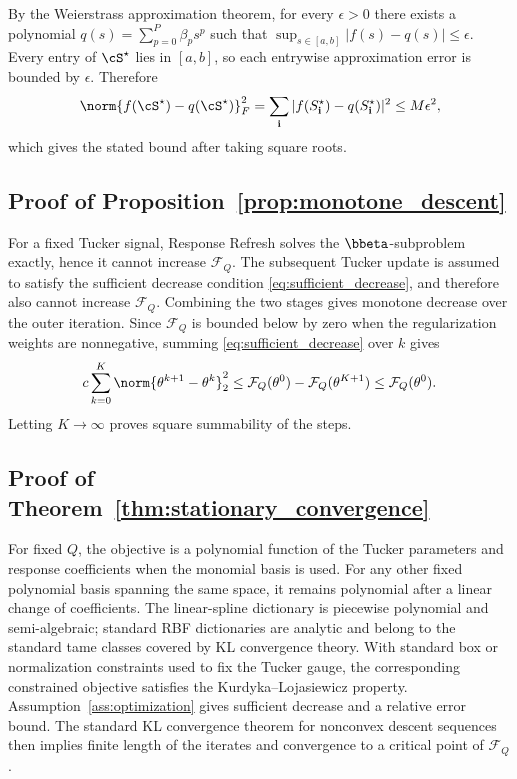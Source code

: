 By the Weierstrass approximation theorem, for every $\epsilon>0$ there exists
a polynomial $q(s)=\sum_{p=0}^{P}\beta_ps^p$ such that
$\sup_{s\in[a,b]}|f(s)-q(s)|\le\epsilon$. Every entry of $\cS^\star$ lies in
$[a,b]$, so each entrywise approximation error is bounded by $\epsilon$.
Therefore
\[
  \norm{f(\cS^\star)-q(\cS^\star)}_F^2
  =
  \sum_{\mathbf{i}}
  |f(S^\star_{\mathbf{i}})-q(S^\star_{\mathbf{i}})|^2
  \le
  M\epsilon^2,
\]
which gives the stated bound after taking square roots.

\subsection{Proof of Proposition~\ref{prop:monotone_descent}}

For a fixed Tucker signal, Response Refresh solves the $\bbeta$-subproblem
exactly, hence it cannot increase $\mathcal{F}_Q$. The subsequent Tucker
update is assumed to satisfy the sufficient decrease condition
\eqref{eq:sufficient_decrease}, and therefore also cannot increase
$\mathcal{F}_Q$. Combining the two stages gives monotone decrease over the
outer iteration. Since $\mathcal{F}_Q$ is bounded below by zero when the
regularization weights are nonnegative, summing
\eqref{eq:sufficient_decrease} over $k$ gives
\[
  c\sum_{k=0}^{K}\norm{\theta^{k+1}-\theta^k}_2^2
  \le
  \mathcal{F}_Q(\theta^0)-\mathcal{F}_Q(\theta^{K+1})
  \le
  \mathcal{F}_Q(\theta^0).
\]
Letting $K\to\infty$ proves square summability of the steps.

\subsection{Proof of Theorem~\ref{thm:stationary_convergence}}

For fixed $Q$, the objective is a polynomial function of the Tucker parameters
and response coefficients when the monomial basis is used. For any other fixed
polynomial basis spanning the same space, it remains polynomial after a linear
change of coefficients. The linear-spline dictionary is piecewise polynomial
and semi-algebraic; standard RBF dictionaries are analytic and belong to the
standard tame classes covered by KL convergence theory. With
standard box or normalization constraints used to fix the Tucker gauge, the
corresponding constrained objective satisfies the Kurdyka--Lojasiewicz
property. Assumption~\ref{ass:optimization} gives sufficient decrease and a
relative error bound. The standard KL convergence theorem for nonconvex descent
sequences then implies finite length of the iterates and convergence to a
critical point of $\mathcal{F}_Q$.

